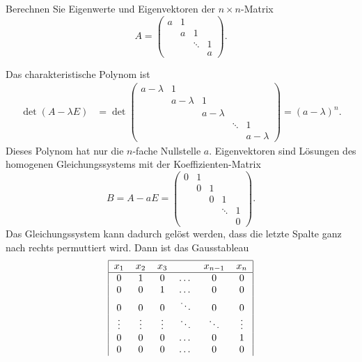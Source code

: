 Berechnen Sie Eigenwerte und Eigenvektoren der $n\times n$-Matrix
\[
A=\begin{pmatrix}
a    &1      &      &      \\
     &      a&     1&      \\
     &       &\ddots&     1\\
     &       &      &     a
\end{pmatrix}.
\]

\begin{loesung}
Das charakteristische Polynom ist
\begin{align*}
\operatorname{det}(A-\lambda E)
&=
\operatorname{det}\begin{pmatrix}
a-\lambda&        1&         &         &         \\
         &a-\lambda&        1&         &         \\
         &         &a-\lambda&         &         \\
         &         &         &\ddots   &        1\\
         &         &         &         &a-\lambda
\end{pmatrix}
=(a-\lambda)^n.
\end{align*}
Dieses Polynom hat nur die $n$-fache Nullstelle $a$.
Eigenvektoren sind Lösungen des homogenen Gleichungssystems
mit der Koeffizienten-Matrix
\[
B=A-aE=\begin{pmatrix}
0&1& &      & \\
 &0&1&      & \\
 & &0&     1& \\
 & & &\ddots&1\\
 & & &      &0
\end{pmatrix}.
\]
Das Gleichungssystem kann dadurch gelöst werden, dass die
letzte Spalte ganz nach rechts permuttiert wird. Dann ist das
Gausstableau
\[
\begin{tabular}{|cccccc|}
\hline
$x_1$&$x_2$&$x_3$&&$x_{n-1}$&$x_n$\\
\hline
0       &1       &0       &$ \dots$&0       &0       \\
0       &0       &1       &$ \dots$&0       &0       \\
0       &0       &0       &$\ddots$&0       &0       \\
$\vdots$&$\vdots$&$\vdots$&$\ddots$&$\ddots$&$\vdots$\\
0       &0       &0       &$ \dots$&0       &1       \\
0       &0       &0       &$ \dots$&0       &0       \\

\end{tabular}\]
\end{loesung}
